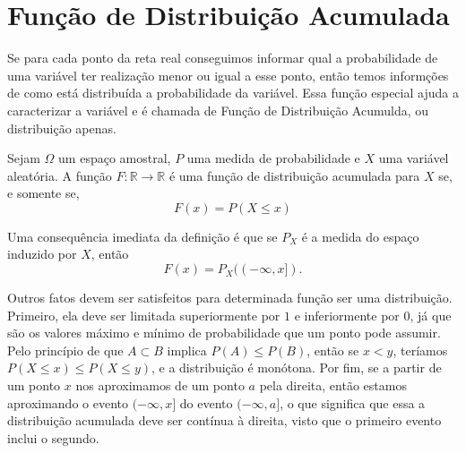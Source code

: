\section{Função de Distribuição Acumulada}

Se para cada ponto da reta real conseguimos informar qual a probabilidade de uma variável
ter realização menor ou igual a esse ponto, então temos informções de como está
distribuída a probabilidade da variável.
Essa função especial ajuda a caracterizar a variável e é chamada de Função de Distribuição
Acumulda, ou distribuição apenas.

\begin{def:cdf}
Sejam $\Omega$ um espaço amostral, $P$ uma medida de probabilidade e $X$
uma variável aleatória.
A função $F: \mathbb{R} \to \mathbb{R}$ é uma função de distribuição acumulada para $X$ se,
e somente se,
\[
	F(x) = P(X \leq x)
\]
\end{def:cdf}

Uma consequência imediata da definição é que se $P_X$ é a medida do espaço induzido por
$X$, então
\[
	F(x) = P_X((-\infty, x]).
\]

Outros fatos devem ser satisfeitos para determinada função ser uma distribuição.
Primeiro, ela deve ser limitada superiormente por $1$ e inferiormente por $0$, já que
são os valores máximo e mínimo de probabilidade que um ponto pode assumir.
Pelo princípio de que $A \subset B$ implica $P(A) \leq P(B)$, então se $x < y$, teríamos
$P(X \leq x) \leq P(X \leq y)$, e a distribuição é monótona.
Por fim, se a partir de um ponto $x$ nos aproximamos de um ponto $a$ pela direita, então
estamos aproximando o evento $(-\infty, x]$ do evento $(-\infty, a]$, o que significa que
essa a distribuição acumulada deve ser contínua à direita, visto que o primeiro evento
inclui o segundo.

